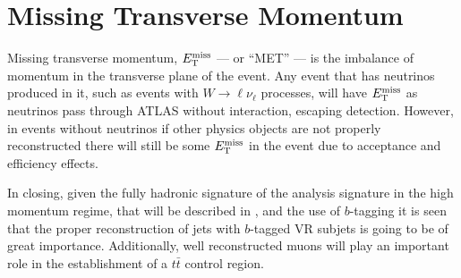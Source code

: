 \section{Missing Transverse Momentum}\label{section:MET}

Missing transverse momentum, $E_{\mathrm{T}}^{\mathrm{miss}}$ --- or ``MET'' --- is the imbalance of momentum in the transverse plane of the event.
Any event that has neutrinos produced in it, such as events with $W \to \ell \nu_{\ell}$ processes, will have $E_{\mathrm{T}}^{\mathrm{miss}}$ as neutrinos pass through ATLAS without interaction, escaping detection.
However, in events without neutrinos if other physics objects are not properly reconstructed there will still be some $E_{\mathrm{T}}^{\mathrm{miss}}$ in the event due to acceptance and efficiency effects.

In closing, given the fully hadronic signature of the analysis signature in the high momentum regime, that will be described in , and the use of $b$-tagging it is seen that the proper reconstruction of \largeR{} jets with $b$-tagged VR subjets is going to be of great importance.
Additionally, well reconstructed muons will play an important role in the establishment of a $t\bar{t}$ control region.
